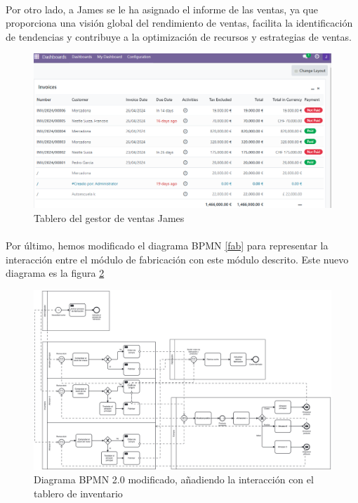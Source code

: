 \paragraph{}
Por otro lado, a James se le ha asignado el informe de las ventas, ya que proporciona una visión global del rendimiento de ventas, facilita la identificación de tendencias y contribuye a la optimización de recursos y estrategias de ventas.
\newpage
\begin{figure}[h]
    \centering
    \includegraphics[width=1\linewidth]{fotosDecisiones/james.png}
    \caption{Tablero del gestor de ventas James}
    \label{fig:enter-label}
\end{figure}
\paragraph{}
Por último, hemos modificado el diagrama BPMN \ref{fab} para representar la interacción entre el módulo de fabricación con este módulo descrito. Este nuevo diagrama es la figura \ref{bi}

\begin{figure}[h]
    \centering
    \includegraphics[width=1\linewidth]{fotosGestFab/BI.png}
    \caption{Diagrama BPMN 2.0 modificado, añadiendo la interacción con el tablero de inventario}
    \label{bi}
\end{figure}
